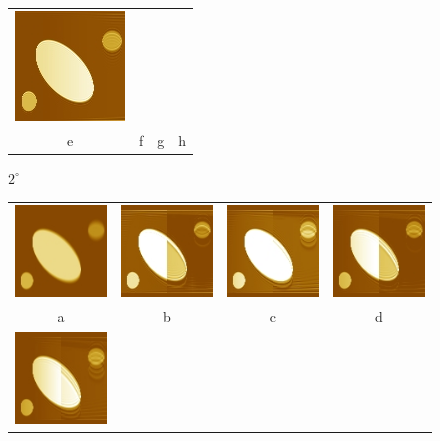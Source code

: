 \documentclass{procDDs}
\begin{document}
\begin{figure}[h!]
\begin{tabular}{cccc}
		\includegraphics[width=0.2\linewidth]{img/6/5.jpg}\\
		e & f & g & h \\
	\end{tabular}
	\caption{$2^\circ$}
\end{figure}
\begin{figure}[h!]\center%
	\begin{tabular}{cccc}
		\includegraphics[width=0.2\linewidth]{img/7/1.jpg}&
		\includegraphics[width=0.2\linewidth]{img/7/3.jpg}&
		\includegraphics[width=0.2\linewidth]{img/7/4.jpg}&
		\includegraphics[width=0.2\linewidth]{img/7/5.jpg}\\
		a & b & c & d\\
		\includegraphics[width=0.2\linewidth]{img/7/6.jpg}&

\end{tabular}
\end{figure}
\end{document}
